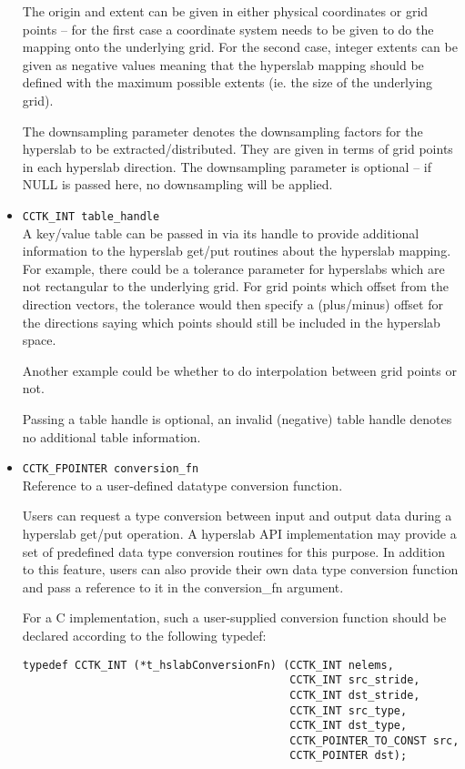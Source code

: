 \documentclass{article}
\begin{document}
\begin{itemize}
    The origin and extent can be given in either physical coordinates or
    grid points -- for the first case a coordinate system needs to be given
    to do the mapping onto the underlying grid.
    For the second case, integer extents can be given as negative values
    meaning that the hyperslab mapping should be defined with the maximum
    possible extents (ie. the size of the underlying grid).

    The downsampling parameter denotes the downsampling factors for the
    hyperslab to be extracted/distributed. They are given in terms of grid points in
    each hyperslab direction. The downsampling parameter is optional --
    if NULL is passed here, no downsampling will be applied.

  \item{\tt CCTK\_INT table\_handle}\\
    A key/value table can be passed in via its handle to provide additional information
    to the hyperslab get/put routines about the hyperslab mapping.
    For example, there could be a tolerance parameter for hyperslabs
    which are not rectangular to the underlying grid. For grid points which offset
    from the direction vectors, the tolerance would then specify a
    (plus/minus) offset for the directions saying which points should
    still be included in the hyperslab space.

    Another example could be
    whether to do interpolation between grid points or not.

    Passing a table handle is optional, an invalid (negative) table handle
    denotes no additional table information.

  \item{\tt CCTK\_FPOINTER  conversion\_fn}\\
    Reference to a user-defined datatype conversion function.

    Users can request a type conversion between input and output data during
    a hyperslab get/put operation. A hyperslab API implementation may provide
    a set of predefined data type conversion routines for this purpose.
    In addition to this feature, users can also provide their own data type
    conversion function and pass a reference to it in the {conversion\_fn} argument.

    For a C implementation, such a user-supplied conversion function should
    be declared according to the following typedef:
\begin{verbatim}
typedef CCTK_INT (*t_hslabConversionFn) (CCTK_INT nelems,
                                         CCTK_INT src_stride,
                                         CCTK_INT dst_stride,
                                         CCTK_INT src_type,
                                         CCTK_INT dst_type,
                                         CCTK_POINTER_TO_CONST src,
                                         CCTK_POINTER dst);
\end{verbatim}


\end{itemize}
\end{document}

